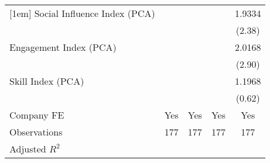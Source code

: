 {\begin{tabular}{l*{4}{c}}
[1em]
Social Influence Index (PCA)       &                   &                   &                   &    1.9334\sym{**} \\
                                   &                   &                   &                   &    (2.38)         \\
[1em]
Engagement Index (PCA)             &                   &                   &                   &    2.0168\sym{***}\\
                                   &                   &                   &                   &    (2.90)         \\
[1em]
Skill Index (PCA)                  &                   &                   &                   &    1.1968         \\
                                   &                   &                   &                   &    (0.62)         \\
[1em]
Company FE                         &       Yes         &       Yes         &       Yes         &       Yes         \\
\hline
Observations                       &       177         &       177         &       177         &       177         \\
Adjusted \(R^{2}\)                 &                   &                   &                   &                   \\
\hline\hline
\end{tabular}
}
